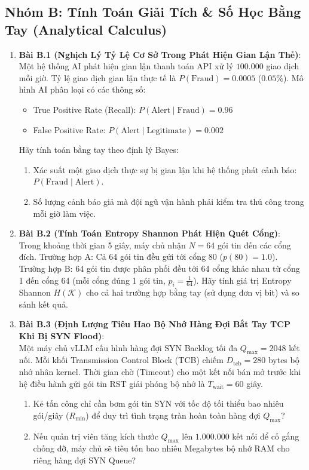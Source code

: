 \subsection{Nhóm B: Tính Toán Giải Tích \& Số Học Bằng Tay (Analytical Calculus)}
\begin{enumerate}
  \item \textbf{Bài B.1 (Nghịch Lý Tỷ Lệ Cơ Sở Trong Phát Hiện Gian Lận Thẻ)}: \\
  Một hệ thống AI phát hiện gian lận thanh toán API xử lý $100.000$ giao dịch mỗi giờ.
  Tỷ lệ giao dịch gian lận thực tế là $P(\text{Fraud}) = 0.0005$ ($0.05\%$).
  Mô hình AI phân loại có các thông số:
  \begin{itemize}
    \item True Positive Rate (Recall): $P(\text{Alert} \mid \text{Fraud}) = 0.96$
    \item False Positive Rate: $P(\text{Alert} \mid \text{Legitimate}) = 0.002$
  \end{itemize}
  Hãy tính toán bằng tay theo định lý Bayes:
  \begin{enumerate}
    \item Xác suất một giao dịch thực sự bị gian lận khi hệ thống phát cảnh báo: $P(\text{Fraud} \mid \text{Alert})$.
    \item Số lượng cảnh báo giả mà đội ngũ vận hành phải kiểm tra thủ công trong mỗi giờ làm việc.
  \end{enumerate}

  \item \textbf{Bài B.2 (Tính Toán Entropy Shannon Phát Hiện Quét Cổng)}: \\
  Trong khoảng thời gian 5 giây, máy chủ nhận $N = 64$ gói tin đến các cổng đích.
  Trường hợp A: Cả 64 gói tin đều gửi tới cổng 80 ($p(80) = 1.0$).
  Trường hợp B: 64 gói tin được phân phối đều tới 64 cổng khác nhau từ cổng 1 đến cổng 64 (mỗi cổng đúng 1 gói tin, $p_i = \frac{1}{64}$).
  Hãy tính giá trị Entropy Shannon $H(\mathcal{K})$ cho cả hai trường hợp bằng tay (sử dụng đơn vị bit) và so sánh kết quả.

  \item \textbf{Bài B.3 (Định Lượng Tiêu Hao Bộ Nhớ Hàng Đợi Bắt Tay TCP Khi Bị SYN Flood)}: \\
  Một máy chủ vLLM cấu hình hàng đợi SYN Backlog tối đa $Q_{\max} = 2048$ kết nối. Mỗi khối Transmission Control Block (TCB) chiếm $D_{\text{tcb}} = 280$ bytes bộ nhớ nhân kernel. Thời gian chờ (Timeout) cho một kết nối bán mở trước khi hệ điều hành gửi gói tin RST giải phóng bộ nhớ là $T_{\text{wait}} = 60$ giây.
  \begin{enumerate}
    \item Kẻ tấn công chỉ cần bơm gói tin SYN với tốc độ tối thiểu bao nhiêu gói/giây ($R_{\min}$) để duy trì tình trạng tràn hoàn toàn hàng đợi $Q_{\max}$?
    \item Nếu quản trị viên tăng kích thước $Q_{\max}$ lên $1.000.000$ kết nối để cố gắng chống đỡ, máy chủ sẽ tiêu tốn bao nhiêu Megabytes bộ nhớ RAM cho riêng hàng đợi SYN Queue?
  \end{enumerate}


\end{enumerate}
